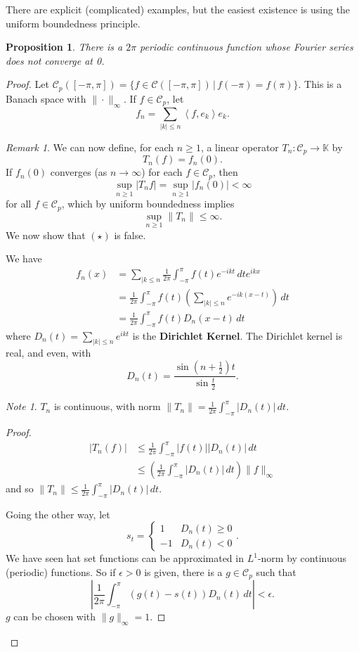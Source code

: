 \documentclass[10pt, reqno, oneside]{amsart}
\theoremstyle{plain}%
\newtheorem{prop}[thm]{Proposition}
\theoremstyle{definition}
\theoremstyle{remark}
\newtheorem*{rem}{Remark}
\newtheorem*{note}{Note}
\newcommand{\given}{ \, | \,}
\newcommand{\K}{\mathbb{K}}
\newcommand{\iprod}[1]{\left\langle #1 \right\rangle}
\begin{document}
There are explicit (complicated) examples, but the easiest existence is using the uniform boundedness principle.  

\begin{prop}
	There is a $2\pi$ periodic continuous function whose Fourier series does not converge at 0.  
\end{prop}
\begin{proof}
	Let $\mathcal{C}_p([-\pi, \pi]) = \{ f \in \mathcal C([-\pi, \pi]) \given f(-\pi) = f(\pi) \}.$  This is a Banach space with $\| \cdot \|_\infty $.  If $f \in \mathcal C_p$, let \[
		f_n = \sum_{|k | \leq n} \iprod{f, e_k} e_k.
	\]
	
\begin{rem}
	We can now define, for each $n \geq 1$, a linear operator $T_n : \mathcal C_p \rightarrow \K$ by \[
		T_n(f) = f_n(0). 
	\]  If $f_n(0)$ converges (as $ n \rightarrow \infty$) for each $f \in \mathcal C_p$, then \[
		\sup_{n \geq 1} |T_n f | = \sup_{n \geq 1} |f_n(0)| < \infty
	\] for all $f \in \mathcal C_p$, which by uniform boundedness implies \[
		\sup_{n \geq 1} \| T_n \| \leq \infty \tag{$\star$}.
	\]  
	We now show that $(\star)$ is false.
\end{rem}
We have \begin{align*}
	f_n(x) 	&= \sum_{| k \leq n} \frac{1}{2 \pi} \int_{-\pi}^\pi f(t) e^{-ikt} \, dt e^{ikx}  \\
			&= \frac{1}{2\pi} \int_{-\pi}^\pi f(t) \left( \sum_{|k| \leq n} e^{-ik(x-t)} \right) \, dt \\
			&= \frac{1}{2 \pi} \int_{-\pi}^\pi f(t) D_n(x-t) \, dt 
\end{align*} where $D_n(t) = \sum_{|k| \leq n} e^{ikt}$ is the \textbf{Dirichlet Kernel}.  The Dirichlet kernel is real, and even, with \[
	D_n(t) = \frac{\sin(n+\frac{1}{2}) t}{\sin \frac{t}{2}}.  
\]  

\begin{note}
	$T_n$ is continuous, with norm $\| T_n \| = \frac{1}{2\pi} \int_{-\pi}^\pi |D_n(t) | \, dt$.
\end{note}
\begin{proof}
	\begin{align*}
		|T_n(f)| &\leq \frac{1}{2\pi} \int_{-\pi}^\pi |f(t)| |D_n(t)| \, dt \\
				&\leq \left( \frac{1}{2\pi} \int_{-\pi}^\pi |D_n(t)| \, dt \right) \| f\|_\infty
	\end{align*} and so $\|T_n \| \leq \frac{1}{2\pi} \int_{-\pi}^\pi |D_n(t)| \, dt$. 
	
	Going the other way, let \[
		s_t = \begin{cases}
		1 &D_n(t) \geq 0 \\
		-1 &D_n(t) < 0
		\end{cases}.
	\]  We have seen hat set functions can be approximated in $L^1$-norm by continuous (periodic) functions.  So if $\epsilon > 0$ is given, there is a $g \in \mathcal C_p$ such that \[
		\left| \frac{1}{2\pi} \int_{-\pi}^\pi (g(t) - s(t))D_n(t) \, dt \right| < \epsilon. 
	\] $g$ can be chosen with $\| g \|_\infty = 1$.  
	

\end{proof}
\end{proof}
\end{document}
